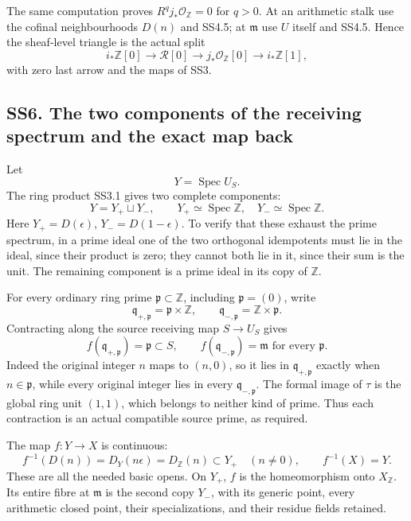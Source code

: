 The same computation proves \(R^qj_*\mathcal O_{\mathbb Z}=0\) for
\(q>0\). At an arithmetic stalk use the cofinal neighbourhoods \(D(n)\)
and SS4.5; at \(\mathfrak m\) use \(U\) itself and SS4.5. Hence the
sheaf-level triangle is the actual split \[
 i_*\mathbb Z[0]\longrightarrow\mathcal R[0]
 \longrightarrow j_*\mathcal O_{\mathbb Z}[0]\longrightarrow
 i_*\mathbb Z[1],
\tag{SS5.7}
\] with zero last arrow and the maps of SS3.

\subsection{SS6. The two components of the receiving spectrum and the
exact map
back}\label{ss6.-the-two-components-of-the-receiving-spectrum-and-the-exact-map-back}

Let \[
 Y=\operatorname{Spec}U_S.
\] The ring product SS3.1 gives two complete components: \[
 Y=Y_+\sqcup Y_-,\qquad
 Y_+\simeq\operatorname{Spec}\mathbb Z,\quad
 Y_-\simeq\operatorname{Spec}\mathbb Z.
\tag{SS6.1}
\] Here \(Y_+=D(\epsilon)\), \(Y_-=D(1-\epsilon)\). To verify that these
exhaust the prime spectrum, in a prime ideal one of the two orthogonal
idempotents must lie in the ideal, since their product is zero; they
cannot both lie in it, since their sum is the unit. The remaining
component is a prime ideal in its copy of \(\mathbb Z\).

For every ordinary ring prime \(\mathfrak p\subset\mathbb Z\), including
\(\mathfrak p=(0)\), write \[
 \mathfrak q_{+,\mathfrak p}=\mathfrak p\times\mathbb Z,\qquad
 \mathfrak q_{-,\mathfrak p}=\mathbb Z\times\mathfrak p.
\tag{SS6.2}
\] Contracting along the source receiving map \(S\to U_S\) gives \[
 f(\mathfrak q_{+,\mathfrak p})=\mathfrak p\subset S,
 \qquad
 \boxed{f(\mathfrak q_{-,\mathfrak p})=\mathfrak m
 \text{ for every }\mathfrak p.}
\tag{SS6.3}
\] Indeed the original integer \(n\) maps to \((n,0)\), so it lies in
\(\mathfrak q_{+,\mathfrak p}\) exactly when \(n\in\mathfrak p\), while
every original integer lies in every \(\mathfrak q_{-,\mathfrak p}\).
The formal image of \(\tau\) is the global ring unit \((1,1)\), which
belongs to neither kind of prime. Thus each contraction is an actual
compatible source prime, as required.

The map \(f:Y\to X\) is continuous: \[
 f^{-1}(D(n))=D_Y(n\epsilon)
 =D_{\mathbb Z}(n)\subset Y_+\quad(n\ne0),
\qquad
 f^{-1}(X)=Y.
\tag{SS6.4}
\] These are all the needed basic opens. On \(Y_+\), \(f\) is the
homeomorphism onto \(X_{\mathbb Z}\). Its entire fibre at
\(\mathfrak m\) is the second copy \(Y_-\), with its generic point,
every arithmetic closed point, their specializations, and their residue
fields retained.

